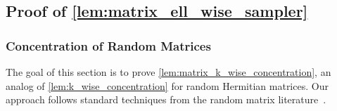 \documentclass[11pt,letterpaper]{article}
\newtheorem{lemma}[theorem]{Lemma}
\newcommand{\R}{\mathbb{R}}
\DeclareMathOperator*{\E}{\mathbb{E}}
\newcommand{\eps}{\varepsilon}
\newcommand{\1}{\mathbbm{1}}
\newcommand{\tuple}[1]{\left(#1\right)}
\newcommand{\Ex}[2][]{ \ifthenelse{\isempty{#1}}
  {\E\left[#2\right]}
  {\E_{#1}\left[#2\right]} }
\begin{document}
\subsection{Proof of \cref{lem:matrix_ell_wise_sampler}}
\label{sec:matrix_lemma_proof}
\subsubsection{Concentration of Random Matrices}
The goal of this section is to prove \cref{lem:matrix_k_wise_concentration}, an analog of \cref{lem:k_wise_concentration} for random Hermitian matrices. Our approach follows standard techniques from the random matrix literature~\cite{Tomczak1974, CGT12, LT13}.









\end{document}
